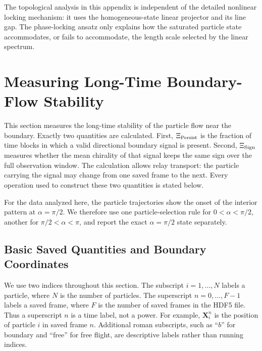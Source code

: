 \documentclass[11pt]{article}
\numberwithin{equation}{section}
\begin{document}
The topological analysis in this appendix is independent of the detailed
nonlinear locking mechanism: it uses the homogeneous-state linear
projector and its line gap. The phase-locking ansatz only explains how
the saturated particle state accommodates, or fails to accommodate, the
length scale selected by the linear spectrum.

\section{Measuring Long-Time Boundary-Flow Stability}
\label{sec:particle_state_robustness}

This section measures the long-time stability of the particle flow near the
boundary.  Exactly two quantities are calculated.  First,
$\Xi_{\rm Persist}$ is the fraction of time blocks in which a valid directional
boundary signal is present.  Second, $\Xi_{\rm Sign}$ measures whether the mean
chirality of that signal keeps the same sign over the full observation window.
The calculation allows relay transport: the particle carrying the signal may
change from one saved frame to the next.  Every operation used to construct
these two quantities is stated below.

For the data analyzed here, the particle trajectories show the onset of the
interior pattern at $\alpha=\pi/2$.  We therefore use one particle-selection
rule for $0<\alpha<\pi/2$, another for $\pi/2<\alpha<\pi$, and report the
exact $\alpha=\pi/2$ state separately.

\subsection{Basic Saved Quantities and Boundary Coordinates}

We use two indices throughout this section.  The subscript
$i=1,\ldots,N$ labels a particle, where $N$ is the number of particles.  The
superscript $n=0,\ldots,F-1$ labels a saved frame, where $F$ is the number of
saved frames in the HDF5 file.  Thus a superscript $n$ is a time label, not a
power.  For example, $\mathbf X_i^n$ is the position of particle $i$ in saved
frame $n$.  Additional roman subscripts, such as ``$b$'' for boundary and
``$\mathrm{free}$'' for free flight, are descriptive labels rather than running
indices.
\end{document}
